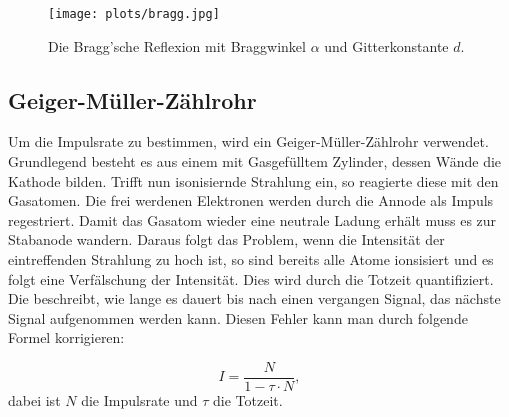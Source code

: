 \begin{figure}
    \centering
    \texttt{[image: plots/bragg.jpg]}
    \caption{Die Bragg'sche Reflexion mit Braggwinkel $\alpha$ und 
    Gitterkonstante $d$.
    }
\end{figure}


\subsection{Geiger-Müller-Zählrohr}
Um die Impulsrate zu bestimmen, wird ein Geiger-Müller-Zählrohr verwendet.
Grundlegend besteht es aus einem mit Gasgefülltem Zylinder, dessen Wände die Kathode bilden.
Trifft nun isonisiernde Strahlung ein, so reagierte diese mit den Gasatomen. 
Die frei werdenen Elektronen werden durch die Annode als Impuls regestriert.
Damit das Gasatom wieder eine neutrale Ladung erhält muss es zur Stabanode wandern.
Daraus folgt das Problem, wenn die Intensität der eintreffenden Strahlung zu hoch ist,
so sind bereits alle Atome ionsisiert und es folgt eine Verfälschung der Intensität.
Dies wird durch die Totzeit quantifiziert. Die beschreibt, wie lange es dauert bis
nach einen vergangen Signal, das nächste Signal aufgenommen werden kann.
Diesen Fehler kann man durch folgende Formel korrigieren:

\begin{equation}
    I=\frac{N}{1-\tau \cdot N},
    \label{eqn:totzeit}
\end{equation}
dabei ist $N$ die Impulsrate und $\tau$ die Totzeit.